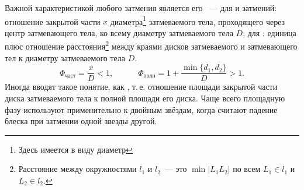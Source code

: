 Важной характеристикой любого затмения является его ~--- для  и  затмений: отношение закрытой части $x$ диаметра\footnote{Здесь имеется в виду  диаметр} затмеваемого тела, проходящего через центр затмевающего тела, ко всему диаметру затмеваемого тела $D$; для : единица плюс отношение расстояния\footnote{Расстояние между окружностями $l_1$ и $l_2$~--- это $\min |L_1L_2|$ по всем $L_1 \in l_1$ и $L_2 \in l_2$.} между краями дисков затмеваемого и затмевающего тел к диаметру затмеваемого тела $D$.
\begin{equation}
    \Phi_{\text{част}} = \frac{x}{D} < 1, \quad \quad \quad \Phi_{\text{полн}} =  1 + \frac{\min\{d_1, d_2\}}{D} > 1.
\end{equation}
Иногда вводят такое понятие, как , т.\,е. отношение площади закрытой части диска затмеваемого тела к полной площади его диска. Чаще всего  площадную фазу используют применительно к двойным звёздам, когда считают падение блеска при затмении одной звезды другой.
